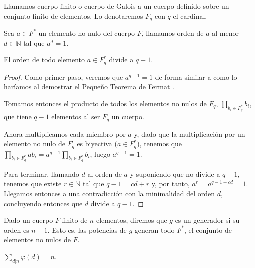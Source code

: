 \begin{dfn}
	Llamamos cuerpo finito o cuerpo de Galois a un cuerpo definido sobre un conjunto finito de elementos. Lo denotaremos $F_q$ con $q$ el cardinal.
\end{dfn}


\begin{dfn}
	Sea $a \in F^*$ un elemento no nulo del cuerpo $F$, llamamos orden de $a$ al menor $d \in \mathbb{N}$ tal que $a^d = 1$.
\end{dfn}

\begin{thm}
	El orden de todo elemento $a \in F^*_q$ divide a $q-1$.
\end{thm}

\begin{proof}
	Como primer paso, veremos que $a^{q-1} = 1$ de forma similar a como lo haríamos al demostrar el Pequeño Teorema de Fermat \cite{Crypto_Bases}.
	
	Tomamos entonces el producto de todos los elementos no nulos de $F_q$, $\displaystyle \prod_{b_i \in F^*_q} b_i$, que tiene $q-1$ elementos al ser $F_q$ un cuerpo.
	
	Ahora multiplicamos cada miembro por $a$ y, dado que la multiplicación por un elemento no nulo de $F_q$ es biyectiva ($a \in F^*_q$), tenemos que $\displaystyle \prod_{b_i \in F^*_q} ab_i = a^{q-1} \prod_{b_i \in F^*_q} b_i$, luego $a^{q-1} = 1$.
	
	Para terminar, llamando $d$ al orden de $a$ y suponiendo que no divide a $q-1$, tenemos que existe $r \in \mathbb{N}$ tal que $q-1 = cd + r$ y, por tanto, $a^r = a^{q - 1 - cd} = 1$. Llegamos entonces a una contradicción con la minimalidad del orden $d$, concluyendo entonces que $d$ divide a $q-1$.	
\end{proof}

\begin{dfn}
	Dado un cuerpo $F$ finito de $n$ elementos, diremos que $g$ es un generador si su orden es $n-1$. Esto es, las potencias de $g$ generan todo $F^*$, el conjunto de elementos no nulos de $F$.
\end{dfn}

\begin{lemma}
	$\displaystyle \sum_{d|n} \varphi(d) = n$.
\end{lemma}

